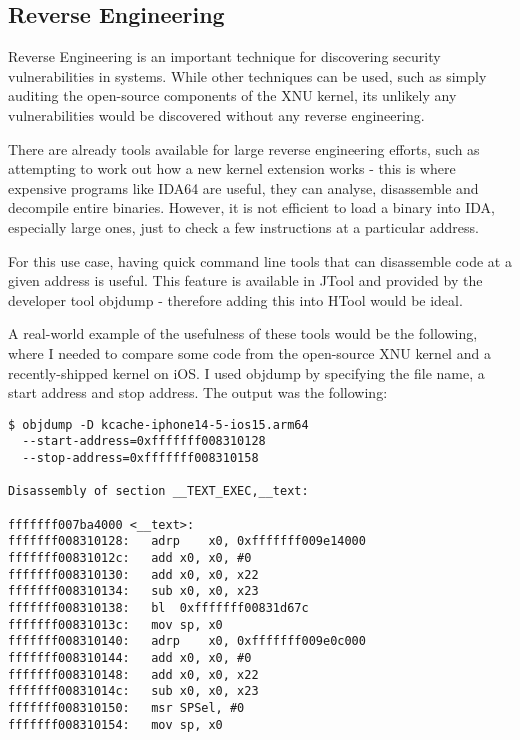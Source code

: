 \subsection{Reverse Engineering}


Reverse Engineering is an important technique for discovering security vulnerabilities in systems. While other techniques can be used, such as simply auditing the open-source components of the XNU kernel, its unlikely any vulnerabilities would be discovered without any reverse engineering. 


There are already tools available for large reverse engineering efforts, such as attempting to work out how a new kernel extension works - this is where expensive programs like IDA64 are useful, they can analyse, disassemble and decompile entire binaries. However, it is not efficient to load a binary into IDA, especially large ones, just to check a few instructions at a particular address. 

For this use case, having quick command line tools that can disassemble code at a given address is useful. This feature is available in JTool and provided by the developer tool objdump - therefore adding this into HTool would be ideal.

A real-world example of the usefulness of these tools would be the following, where I needed to compare some code from the open-source XNU kernel and a recently-shipped kernel on iOS. I used objdump by specifying the file name, a start address and stop address. The output was the following:

\begin{verbatim}
$ objdump -D kcache-iphone14-5-ios15.arm64 
  --start-address=0xfffffff008310128 
  --stop-address=0xfffffff008310158
	
Disassembly of section __TEXT_EXEC,__text:

fffffff007ba4000 <__text>:
fffffff008310128:  	adrp	x0, 0xfffffff009e14000
fffffff00831012c:  	add	x0, x0, #0
fffffff008310130:  	add	x0, x0, x22
fffffff008310134:  	sub	x0, x0, x23
fffffff008310138:  	bl	0xfffffff00831d67c
fffffff00831013c:  	mov	sp, x0
fffffff008310140:  	adrp	x0, 0xfffffff009e0c000
fffffff008310144:  	add	x0, x0, #0
fffffff008310148:  	add	x0, x0, x22
fffffff00831014c:  	sub	x0, x0, x23
fffffff008310150:  	msr	SPSel, #0
fffffff008310154:  	mov	sp, x0
\end{verbatim}


